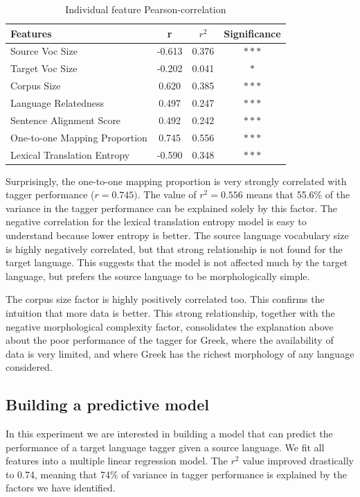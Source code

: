 \begin{table}
\centering
\small
    \begin{tabular}{lccc}
    Features & r & $r^2$ & Significance\\\hline
    Source Voc Size	& -0.613	&0.376 & $***$ \\
    Target Voc Size	& -0.202	& 0.041 & $*$ \\
    Corpus Size	& 0.620	& 0.385 & $***$ \\
    Language Relatedness	& 0.497	& 0.247 & $***$ \\
    Sentence Alignment Score & 	0.492	& 0.242 & $***$\\
    One-to-one Mapping Proportion	& 0.745	& 0.556& $***$\\
    Lexical Translation Entropy	& -0.590	& 0.348& $***$\\

    \end{tabular}
    \caption{Individual feature Pearson-correlation}
    \label{tbl:individualFactorCor}
\end{table}

Surprisingly, the one-to-one mapping proportion is very strongly correlated with tagger performance ($r=0.745)$. The value of $r^2 = 0.556$ means that 55.6\% of the variance in the tagger performance can be explained solely by this factor. The negative correlation for the lexical translation entropy model is easy to understand because lower entropy is better. The source language vocabulary size is highly negatively correlated, but that strong relationship is not found for the target language. This suggests that the model is not affected much by the target language, but prefers the source language to be morphologically simple.


The corpus size factor is highly positively correlated too. This confirms the intuition that more data is better. This strong relationship, together with the negative morphological complexity factor, consolidates the explanation above about the poor performance of the tagger for Greek, where the availability of data is very limited, and where Greek has the richest morphology of any language considered.


\subsection{Building a predictive model}
In this experiment we are interested in building a model that can predict the performance of a target language tagger given a source language. We fit all features into a multiple linear regression model. The $r^2$ value improved drastically to 0.74, meaning that 74\% of variance in tagger performance is explained by the factors we have identified.


